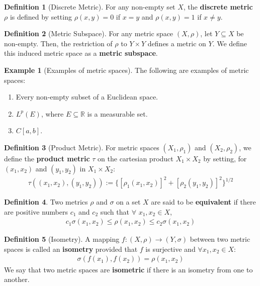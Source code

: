 \documentclass[11pt]{article}
\theoremstyle{definition}
\newtheorem{exmp}{Example}[section]
\theoremstyle{definition}
\newcommand{\R}[0]{\mathbb{R}}
\theoremstyle{definition}
\newtheorem{definition}{\textcolor{OliveGreen}{Definition}}
\theoremstyle{remark}
\begin{document}
\begin{definition}[Discrete Metric]
	For any non-empty set $X$, the \textbf{discrete metric} $\rho$ is defined by setting $\rho(x,y) = 0$ if $x = y$ and $\rho(x,y) = 1$ if $x \neq y$. 
\end{definition}

\begin{definition}[Metric Subspace]
	For any metric space $(X, \rho)$, let $Y \subseteq X$ be non-empty. Then, the restriction of $\rho$ to $Y \times Y$ defines a metric on $Y$. We define this induced metric space as a \textbf{metric subspace}. 
\end{definition}

\begin{exmp}[Examples of metric spaces] The following are examples of metric spaces: 
\begin{enumerate}[noitemsep]
	\item Every non-empty subset of a Euclidean space. 
	\item $L^p(E)$, where $E \subseteq \R$ is a measurable set. 
	\item $C[a,b]$. 
\end{enumerate}
\end{exmp}

\begin{definition}[Product Metric] For metric spaces $(X_1, \rho_1)$ and $(X_2, \rho_2)$, we define the \textbf{product metric} $\tau$ on the cartesian product $X_1 \times X_2$ by setting, for $(x_1, x_2)$ and $(y_1, y_2)$ in $X_1 \times X_2$:
	\begin{align}
		\tau ( (x_1, x_2), (y_1, y_2) ) := \{ 	[\rho_1(x_1, x_2)]^2 + [\rho_2(y_1, y_2)]^2	\}^{1/2} 
	\end{align}
\end{definition}

\begin{definition}
	Two metrics $\rho$ and $\sigma$ on a set $X$ are said to be \textbf{equivalent} if there are positive numbers $c_1$ and $c_2$ such that $\forall$ $x_1, x_2 \in X$, 
	\begin{align*}
		c_1 \sigma (x_1, x_2) \leq \rho(x_1, x_2) \leq c_2 \sigma(x_1, x_2) 	
	\end{align*}
\end{definition}

\begin{definition}[Isometry] 
	A mapping $f: (X, \rho) \rightarrow (Y, \sigma)$ between two metric spaces is called an \textbf{isometry} provided that $f$ is surjective and $\forall x_1, x_2 \in X$: 
	\begin{align}
		\sigma(f(x_1), f(x_2)) = \rho(x_1, x_2) 
	\end{align}
	We say that two metric spaces are \textbf{isometric} if there is an isometry from one to another. 
\end{definition}
\end{document}
